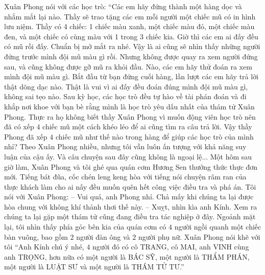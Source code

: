 	\vskip 0.1cm
	\textbf{\color{toancuabi}{CHIẾC MŨ KỶ NIỆM}}
	\vskip 0.1cm
	Xuân Phong nói với các học trò: “Các em hãy đứng thành một hàng dọc và nhắm mắt lại nào. Thầy sẽ trao tặng các em mỗi người một chiếc mũ có in hình lưu niệm. Thầy có 4 chiếc: 1 chiếc màu xanh, một chiếc màu đỏ, một chiếc màu đen, và một chiếc có cùng màu với 1 trong 3 chiếc kia. Giờ thì các em ai đấy đều có mũ rồi đấy. Chuẩn bị mở mắt ra nhé. Vậy là ai cũng sẽ nhìn thấy những người đứng trước mình đội mũ màu gì rồi. Nhưng không được quay ra xem người đứng sau, và cũng không được gỡ mũ ra khỏi đầu. Nào, các em hãy thử đoán ra xem mình đội mũ màu gì. Bắt đầu từ bạn đứng cuối hàng, lần lượt các em hãy trả lời thật dõng dạc nào. 
	\vskip 0.1cm
	Thật là vui vì ai đấy đều đoán đúng mình đội mũ màu gì, không sai tẹo nào. Sau kỳ học, các học trò đều tự hào về tài phán đoán và đi khắp nơi khoe với bạn bè rằng mình là học trò yêu dấu nhất của thám tử Xuân Phong. Thực ra họ không biết thầy Xuân Phong vì muốn động viên học trò nên đã có xếp $4$ chiếc mũ một cách khéo léo để ai cũng tìm ra câu trả lời. 
	\vskip 0.1cm
	Vậy thầy Phong đã xếp $4$ chiếc mũ như thế nào trong hàng để giúp các học trò của mình nhỉ? 
	\vskip 0.1cm
	Theo Xuân Phong nhiều, nhưng tôi vẫn luôn ấn tượng với khả năng suy luận của cậu ấy. Và câu chuyện sau đây cũng không là ngoại lệ...
	\vskip 0.1cm
	\textbf{\color{toancuabi}{VỊ THÁM TỬ ẨN DANH}}
	\vskip 0.1cm
	Một hôm sau giờ làm, Xuân Phong và tôi ghé qua quán cơm Hương Sen thưởng thức thực đơn mới. Tiếng bát đũa, cốc chén leng keng hòa với tiếng nói chuyện râm ran của thực khách làm cho ai nấy đều muốn quên hết công việc điều tra và phá án. 
	\vskip 0.1cm
	Tôi nói với Xuân Phong: 
	\vskip 0.1cm
	-- Vui quá, anh Phong nhỉ. Chả mấy khi chúng ta lại được hòa chung với không khí thảnh thơi thế này. 
	\vskip 0.1cm
	-- Xuỵt, nhìn kìa anh Kính. Xem ra chúng ta lại gặp một thám tử cũng đang điều tra tác nghiệp ở đây. 
	\vskip 0.1cm
	Ngoảnh mặt lại, tôi nhìn thấy phía góc bên kia của quán cơm có $4$ người ngồi quanh một chiếc bàn vuông, bao gồm $2$ người đàn ông và $2$ người phụ nữ. Xuân Phong nói khẽ với tôi “Anh Kính chú ý nhé, $4$ người đó có cô TRANG, cô MAI, anh VINH cùng anh TRỌNG, hơn nữa có một người là BÁC SỸ, một người là THẨM PHÁN, một người là LUẬT SƯ và một người là THÁM TỬ TƯ.” 
